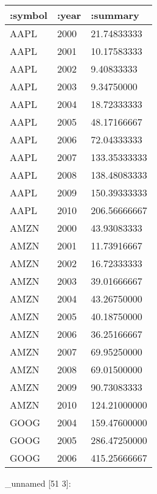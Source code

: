 \documentclass[]{article}
\newenvironment{Shaded}{\begin{snugshade}}{\end{snugshade}}
\newcommand{\AttributeTok}[1]{\textcolor[rgb]{0.77,0.63,0.00}{#1}}
\newcommand{\DecValTok}[1]{\textcolor[rgb]{0.00,0.00,0.81}{#1}}
\newcommand{\KeywordTok}[1]{\textcolor[rgb]{0.13,0.29,0.53}{\textbf{#1}}}
\newcommand{\NormalTok}[1]{#1}
\newcommand{\VariableTok}[1]{\textcolor[rgb]{0.00,0.00,0.00}{#1}}
\begin{document}
\begin{longtable}[]{@{}lll@{}}
\toprule
:symbol & :year & :summary\tabularnewline
\midrule
\endhead
AAPL & 2000 & 21.74833333\tabularnewline
AAPL & 2001 & 10.17583333\tabularnewline
AAPL & 2002 & 9.40833333\tabularnewline
AAPL & 2003 & 9.34750000\tabularnewline
AAPL & 2004 & 18.72333333\tabularnewline
AAPL & 2005 & 48.17166667\tabularnewline
AAPL & 2006 & 72.04333333\tabularnewline
AAPL & 2007 & 133.35333333\tabularnewline
AAPL & 2008 & 138.48083333\tabularnewline
AAPL & 2009 & 150.39333333\tabularnewline
AAPL & 2010 & 206.56666667\tabularnewline
AMZN & 2000 & 43.93083333\tabularnewline
AMZN & 2001 & 11.73916667\tabularnewline
AMZN & 2002 & 16.72333333\tabularnewline
AMZN & 2003 & 39.01666667\tabularnewline
AMZN & 2004 & 43.26750000\tabularnewline
AMZN & 2005 & 40.18750000\tabularnewline
AMZN & 2006 & 36.25166667\tabularnewline
AMZN & 2007 & 69.95250000\tabularnewline
AMZN & 2008 & 69.01500000\tabularnewline
AMZN & 2009 & 90.73083333\tabularnewline
AMZN & 2010 & 124.21000000\tabularnewline
GOOG & 2004 & 159.47600000\tabularnewline
GOOG & 2005 & 286.47250000\tabularnewline
GOOG & 2006 & 415.25666667\tabularnewline
\bottomrule
\end{longtable}

\begin{Shaded}
\end{Shaded}

\_unnamed {[}51 3{]}:
\end{document}
